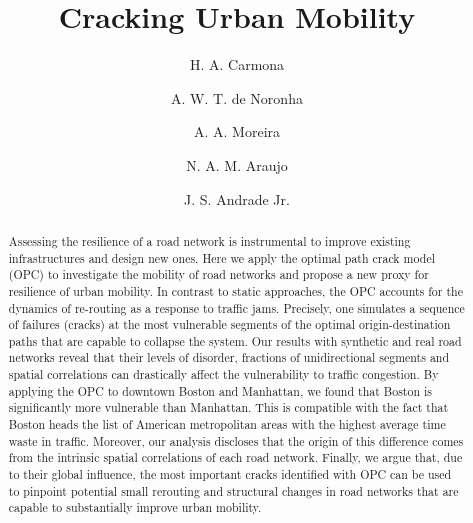 \documentclass[aps,prl,twocolumn,showpacs,
superscriptaddress,floatfix, 10pt]{revtex4-1}
\begin{document}
	
\title{Cracking Urban Mobility}
	
\author{H. A. Carmona} 
	
\author{A. W. T. de Noronha} 
	
\author{A. A. Moreira} 
	
\author{N. A. M. Araujo} 
 
	
\author{J. S. Andrade Jr.} 


\begin{abstract} 
Assessing the resilience of a road network is instrumental to improve existing
infrastructures and design new ones. Here we apply the optimal path crack model
(OPC) to investigate the mobility of road networks and propose a new proxy for
resilience of urban mobility. In contrast to static approaches, the OPC accounts
for the dynamics of re-routing as a response to traffic jams. Precisely, one
simulates a sequence of failures (cracks) at the most vulnerable segments of the
optimal origin-destination paths that are capable to collapse the system. Our
results with synthetic and real road networks reveal that their levels of
disorder, fractions of unidirectional segments and spatial correlations can
drastically affect the vulnerability to traffic congestion. By applying the OPC
to downtown Boston and Manhattan, we found that Boston is significantly more
vulnerable than Manhattan. This is compatible with the fact that Boston heads
the list of American metropolitan areas with the highest average time waste in
traffic. Moreover, our analysis discloses that the origin of this difference
comes from the intrinsic spatial correlations of each road network. Finally, we
argue that, due to their global influence, the most important cracks identified
with OPC can be used to pinpoint potential small rerouting and structural
changes in road networks that are capable to substantially improve urban
mobility.
\end{abstract}
	
\end{document}
